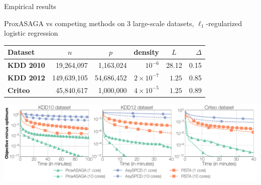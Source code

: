 \documentclass[10pt]{beamer}
\begin{document}
\begin{frame}{Empirical results}




ProxASAGA vs competing methods on 3 large-scale datasets, $\ell_1$-regularized logistic regression

\vspace{0em}\begingroup
\fontsize{9pt}{10pt}\selectfont
\begin{table}
\centering
\begin{tabular}{lrrrrr}
\toprule
{\bfseries\sffamily Dataset} & \multicolumn{1}{c}{$n$} & \multicolumn{1}{c}{$p$} & {{density}} & \multicolumn{1}{c}{$L$} & $\Delta$\\
\midrule
{\bfseries\sffamily KDD 2010} & \hfill 19,264,097 & \hfill 1,163,024 & \hfill $10^{-6}$ & \hfill 28.12 & 0.15\\
{\bfseries\sffamily KDD 2012} & \hfill 149,639,105 & \hfill 54,686,452 & \hfill $2 \times 10^{-7}$ & \hfill $1.25$ & 0.85\\
{\bfseries\sffamily Criteo} & \hfill 45,840,617 & \hfill 1,000,000 & \hfill $4 \times 10^{-5}$ & \hfill $1.25$ & 0.89\\
\bottomrule
\end{tabular}
\end{table}
\endgroup


\includegraphics[width=1\linewidth]{img/prox_asaga_1}

\end{frame}
\end{document}
